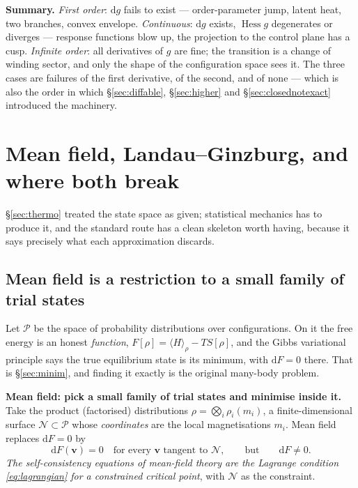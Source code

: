 \documentclass[10pt,a4paper]{article}
\newcommand{\dd}{\mathrm{d}}
\newcommand{\vv}{\mathbf{v}}
\DeclareMathOperator{\Hess}{Hess}
\theoremstyle{plain}
\theoremstyle{definition}
\numberwithin{equation}{section}
\begin{document}
\begin{keybox}
\textbf{Summary.} \emph{First order}: $\dd g$ fails to exist --- order-parameter jump, latent
heat, two branches, convex envelope. \emph{Continuous}: $\dd g$ exists, $\Hess g$ degenerates
or diverges --- response functions blow up, the projection to the control plane has a cusp.
\emph{Infinite order}: all derivatives of $g$ are fine; the transition is a change of winding
sector, and only the shape of the configuration space sees it. The three cases are failures of
the first derivative, of the second, and of none --- which is also the order in which
\S\ref{sec:diffable}, \S\ref{sec:higher} and \S\ref{sec:closednotexact} introduced the
machinery.
\end{keybox}


\section{Mean field, Landau--Ginzburg, and where both break}
\label{sec:meanfield}

\S\ref{sec:thermo} treated the state space as given; statistical mechanics has to produce it,
and the standard route has a clean skeleton worth having, because it says precisely what each
approximation discards.

\subsection{Mean field is a restriction to a small family of trial states}
\label{sec:mfrestrict}

Let $\mathcal P$ be the space of probability distributions over configurations. On it the free
energy is an honest \emph{function},
$F[\rho]=\langle H\rangle_\rho-TS[\rho]$, and the Gibbs variational principle says the true
equilibrium state is its minimum, with $\dd F=0$ there. That is \S\ref{sec:minim}, and finding
it exactly is the original many-body problem.

\begin{keybox}
\textbf{Mean field: pick a small family of trial states and minimise inside it.} Take the
product (factorised) distributions $\rho=\bigotimes_i\rho_i(m_i)$, a finite-dimensional surface
$\mathcal N\subset\mathcal P$ whose \emph{coordinates} are the local magnetisations $m_i$. Mean
field replaces $\dd F=0$ by
\begin{equation}
\dd F(\vv)=0\quad\text{for every }\vv\text{ tangent to }\mathcal N,
\qquad\text{but}\qquad \dd F\ne0 .
\label{eq:mfcrit}
\end{equation}
\emph{The self-consistency equations of mean-field theory are the Lagrange condition
\eqref{eq:lagrangian} for a constrained critical point}, with $\mathcal N$ as the constraint.
\end{keybox}
\end{document}
